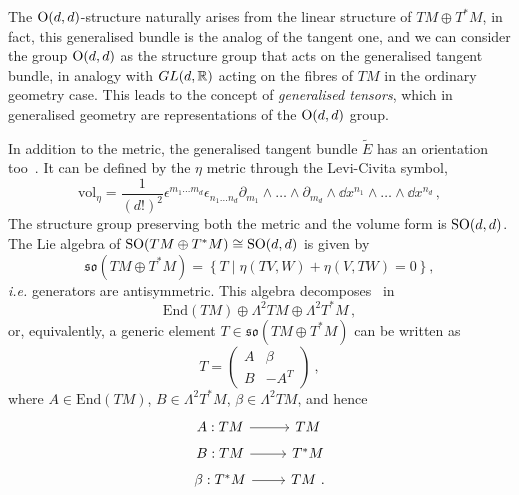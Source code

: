 \documentclass[debug]{phd}
\begin{document}
					The $\mathrm{O}(d,d)$-structure naturally arises from the linear structure of $TM \oplus T^{*}M$, in fact, this generalised bundle is the analog of the tangent one, and we can consider the group $\mathrm{O}(d,d)$ as the structure group that acts on the generalised tangent bundle, in analogy with $GL(d, \mathbb{R})$ acting on the fibres of $TM$ in the ordinary geometry case.
					This leads to the concept of \emph{generalised tensors}, which in generalised geometry are representations of the $\mathrm{O}(d,d)$ group.
					
					In addition to the metric, the generalised tangent bundle $\tilde{E}$ has an orientation too~\cite{gualtphd}.
					It can be defined by the $\eta$ metric through the Levi-Civita symbol,
							\begin{equation}
								\mathrm{vol}_\eta = \frac{1}{(d!)^2} \epsilon^{m_1 \ldots m_d} \epsilon_{n_1 \ldots n_d} \partial_{m_1} \wedge \ldots \wedge \partial_{m_d} \wedge \dd x^{n_1} \wedge \ldots \wedge \dd x^{n_d} \, ,
							\end{equation}
					The structure group preserving both the metric and the volume form is $\mathrm{SO}(d,d)$.
					The Lie algebra of $\mathrm{SO}(TM \oplus T^{*}M) \cong \mathrm{SO}(d,d)$ is given by 
							\begin{equation}\label{soalg}
								\mathfrak{so}(TM \oplus T^{*}M) = \left\{ T \mid \eta( TV , W) + \eta( V , TW ) = 0 \right\},
							\end{equation}
					\textit{i.e.} generators are antisymmetric. 
					This algebra decomposes~\cite{KoerberReview} in 
							\begin{equation}\label{sodec}
								\mathrm{End}(TM) \oplus \Lambda^2 TM \oplus \Lambda^2 T^*M \, ,
							\end{equation} 
					or, equivalently, a generic element $T \in \mathfrak{so}(TM \oplus T^{*}M)$ can be written as
							\begin{equation}\label{Bbeta}
								T = \begin{pmatrix} A & \beta \\ B & -A^{T} \end{pmatrix}\ ,
							\end{equation}
					where $A \in \mathrm{End}(TM)$, $B \in \Lambda^2 T^*M$, $\beta \in \Lambda^2 TM$, and hence
							\begin{equation*}
								\begin{tikzcd}[row sep=tiny]
									A : TM \arrow{r} & TM \\
									B : TM \arrow{r} & T^*M \\
									\beta : T^*M \arrow{r} & TM\ .
								\end{tikzcd}
							\end{equation*}
\end{document}
